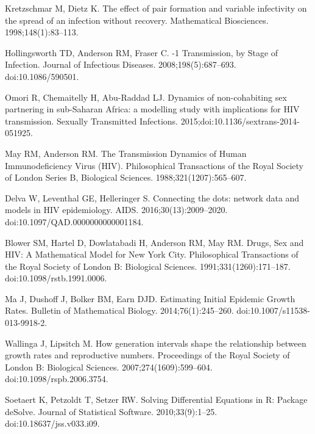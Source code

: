 \documentclass[10pt,letterpaper]{article}
\begin{document}
\begin{thebibliography}{10}
Kretzschmar M, Dietz K.
\newblock The effect of pair formation and variable infectivity on the spread
  of an infection without recovery.
\newblock Mathematical Biosciences. 1998;148(1):83--113.

Hollingsworth TD, Anderson RM, Fraser C.
-1 Transmission, by Stage of Infection.
\newblock Journal of Infectious Diseases. 2008;198(5):687--693.
\newblock doi:{10.1086/590501}.

Omori R, Chemaitelly H, Abu-Raddad LJ.
\newblock Dynamics of non-cohabiting sex partnering in sub-{Saharan} {Africa}:
  a modelling study with implications for {HIV} transmission.
\newblock Sexually Transmitted Infections.
  2015;doi:{10.1136/sextrans-2014-051925}.

May RM, Anderson RM.
\newblock The Transmission Dynamics of Human Immunodeficiency Virus (HIV).
\newblock Philosophical Transactions of the Royal Society of London Series B,
  Biological Sciences. 1988;321(1207):565--607.

Delva W, Leventhal GE, Helleringer S.
\newblock Connecting the dots: network data and models in {HIV} epidemiology.
\newblock AIDS. 2016;30(13):2009--2020.
\newblock doi:{10.1097/QAD.0000000000001184}.

Blower SM, Hartel D, Dowlatabadi H, Anderson RM, May RM.
\newblock Drugs, Sex and {HIV}: A Mathematical Model for {New York City}.
\newblock Philosophical Transactions of the Royal Society of London B:
  Biological Sciences. 1991;331(1260):171--187.
\newblock doi:{10.1098/rstb.1991.0006}.

Ma J, Dushoff J, Bolker BM, Earn DJD.
\newblock Estimating Initial Epidemic Growth Rates.
\newblock Bulletin of Mathematical Biology. 2014;76(1):245--260.
\newblock doi:{10.1007/s11538-013-9918-2}.

Wallinga J, Lipsitch M.
\newblock How generation intervals shape the relationship between growth rates
  and reproductive numbers.
\newblock Proceedings of the Royal Society of London B: Biological Sciences.
  2007;274(1609):599--604.
\newblock doi:{10.1098/rspb.2006.3754}.

Soetaert K, Petzoldt T, Setzer RW.
\newblock Solving Differential Equations in {R}: Package {deSolve}.
\newblock Journal of Statistical Software. 2010;33(9):1--25.
\newblock doi:{10.18637/jss.v033.i09}.


\end{thebibliography}
\end{document}
